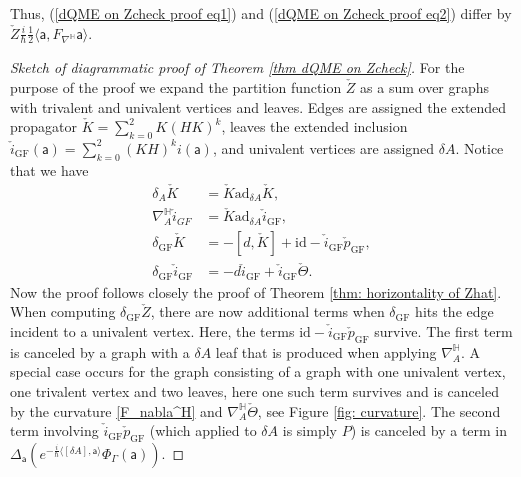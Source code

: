 \documentclass[11pt,a4paper]{amsart}
\theoremstyle{plain} %
\theoremstyle{definition}
\theoremstyle{remark}
\newcommand{\HH}{\mathbb{H}}
\newcommand{\mr}{\mathrm}
\newcommand{\sfa}{\mathsf{a}}
\newcommand{\ra}{\rightarrow}
\begin{document}
{Thus, (\ref{dQME on Zcheck proof eq1}) and (\ref{dQME on Zcheck proof eq2}) differ by 
$\check{Z}\frac{i}{\hbar}\frac12 \langle \sfa,F_{\nabla^\HH} \sfa\rangle$.

\begin{proof}[Sketch of diagrammatic proof of Theorem \ref{thm dQME on Zcheck}] 
For the purpose of the proof %
we expand the partition function $\check{Z}$ as a sum over graphs with trivalent and univalent vertices and leaves. Edges are assigned the extended propagator $\check{K}= \sum_{k=0}^2 K(HK)^k$, leaves the extended inclusion $\check{i}_{\mr{GF}}(\sfa) = \sum_{k=0}^2 (KH)^ki(\sfa)$, and univalent vertices are assigned $\delta A$. 
Notice that we have 
\begin{align}
    \delta_A
    \check{K} &= \check{K}\mr{ad}_{\delta A}\check{K}, \\
    \nabla^\HH_A \check{i}_{GF} &= \check{K}\mr{ad}_{\delta A}\check{i}_\mr{GF}, \\
    \delta_{\mr{GF}}\check{K} &= - [d,\check{K}] + \mr{id} - \check{i}_{\mr{GF}}\check{p}_\mr{GF}, \\
    \delta_\mr{GF}\check{i}_\mr{GF} &= - d\check{i}_\mr{GF} + \check{i}_{\mr{GF}}\check{\Theta}.
\end{align}
Now the proof follows closely the proof of Theorem \ref{thm: horizontality of Zhat}. When computing $\delta_{\mr{GF}}\check{Z}$, there are now additional terms when $\delta_\mr{GF}$ hits the edge incident to a univalent vertex. Here, the terms $\mr{id} - \check{i}_{\mr{GF}}\check{p}_\mr{GF}$ survive. The first term is canceled by a graph with a $\delta A$ leaf that is produced when applying $\nabla^\HH_A$. A special case occurs for the graph consisting of a graph with one univalent vertex, one trivalent vertex and two leaves, here one such term survives and is canceled by the curvature \eqref{F_nabla^H} and $\nabla^\HH_A\check{\Theta}$, see Figure \ref{fig: curvature}. The second term involving $\check{i}_\mr{GF}\check{p}_\mr{GF}$ (which applied to $\delta A$ is simply $P$) is canceled by a term in  $\Delta_\sfa(e^{-\frac{i}{\hbar}\langle [\delta A], \sfa\rangle}\Phi_\Gamma (\sfa))$. 

\end{proof}}
\end{document}
